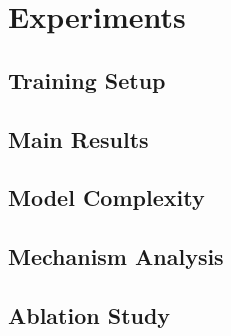 \section{Experiments}
\label{sec:experiments}

\subsection{Training Setup}

\subsection{Main Results}

\subsection{Model Complexity}

\subsection{Mechanism Analysis}

\subsection{Ablation Study}
